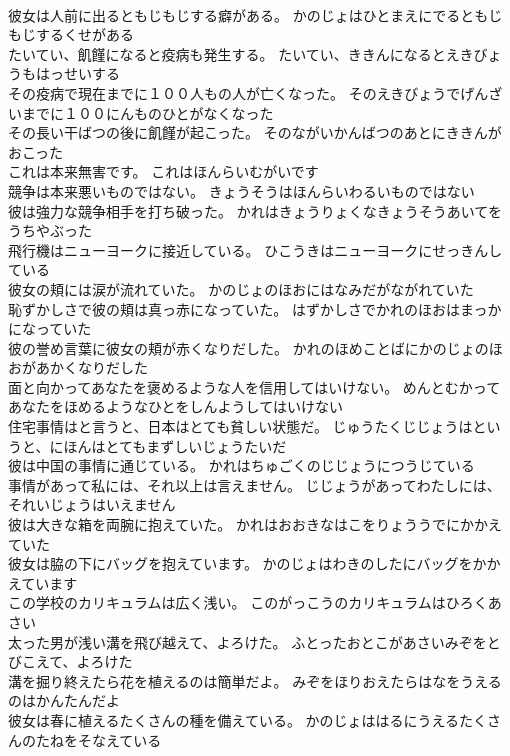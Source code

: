 \documentclass[8pt]{extreport}
\begin{document}
\begin{CJK}{UTF8}{min}
\\	彼女は人前に出るともじもじする癖がある。	かのじょはひとまえにでるともじもじするくせがある 
\\	たいてい、飢饉になると疫病も発生する。	たいてい、ききんになるとえきびょうもはっせいする 
\\	その疫病で現在までに１００人もの人が亡くなった。	そのえきびょうでげんざいまでに１００にんものひとがなくなった 
\\	その長い干ばつの後に飢饉が起こった。	そのながいかんばつのあとにききんがおこった 
\\	これは本来無害です。	これはほんらいむがいです 
\\	競争は本来悪いものではない。	きょうそうはほんらいわるいものではない 
\\	彼は強力な競争相手を打ち破った。	かれはきょうりょくなきょうそうあいてをうちやぶった 
\\	飛行機はニューヨークに接近している。	ひこうきはニューヨークにせっきんしている 
\\	彼女の頬には涙が流れていた。	かのじょのほおにはなみだがながれていた 
\\	恥ずかしさで彼の頬は真っ赤になっていた。	はずかしさでかれのほおはまっかになっていた 
\\	彼の誉め言葉に彼女の頬が赤くなりだした。	かれのほめことばにかのじょのほおがあかくなりだした 
\\	面と向かってあなたを褒めるような人を信用してはいけない。	めんとむかってあなたをほめるようなひとをしんようしてはいけない 
\\	住宅事情はと言うと、日本はとても貧しい状態だ。	じゅうたくじじょうはというと、にほんはとてもまずしいじょうたいだ 
\\	彼は中国の事情に通じている。	かれはちゅごくのじじょうにつうじている 
\\	事情があって私には、それ以上は言えません。	じじょうがあってわたしには、それいじょうはいえません 
\\	彼は大きな箱を両腕に抱えていた。	かれはおおきなはこをりょううでにかかえていた 
\\	彼女は脇の下にバッグを抱えています。	かのじょはわきのしたにバッグをかかえています 
\\	この学校のカリキュラムは広く浅い。	このがっこうのカリキュラムはひろくあさい 
\\	太った男が浅い溝を飛び越えて、よろけた。	ふとったおとこがあさいみぞをとびこえて、よろけた 
\\	溝を掘り終えたら花を植えるのは簡単だよ。	みぞをほりおえたらはなをうえるのはかんたんだよ 
\\	彼女は春に植えるたくさんの種を備えている。	かのじょははるにうえるたくさんのたねをそなえている 

\end{CJK}
\end{document}
